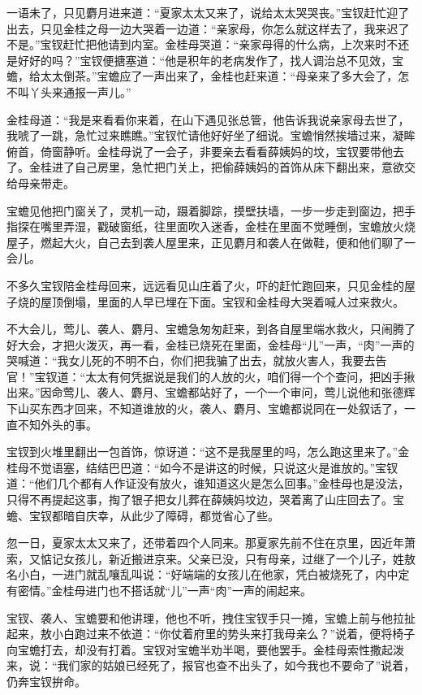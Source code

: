 \documentclass[12pt,oneside]{book}
\begin{document}
一语未了，只见麝月进来道：“夏家太太又来了，说给太太哭哭丧。”宝钗赶忙迎了出去，只见金桂之母一边大哭着一边道：“亲家母，你怎么就这样去了，我来迟了不是。”宝钗赶忙把他请到内室。金桂母哭道：“亲家母得的什么病，上次来时不还是好好的吗？”宝钗便搪塞道：“他是积年的老病发作了，找人调治总不见效，宝蟾，给太太倒茶。”宝蟾应了一声出来了，金桂也赶来道：“母亲来了多大会了，怎不叫丫头来通报一声儿。”

金桂母道：“我是来看看你来着，在山下遇见张总管，他告诉我说亲家母去世了，我唬了一跳，急忙过来瞧瞧。”宝钗忙请他好好坐了细说。宝蟾悄然挨墙过来，凝眸俯首，倚窗静听。金桂母说了一会子，非要亲去看看薛姨妈的坟，宝钗要带他去了。金桂进了自己房里，急忙把门关上，把偷薛姨妈的首饰从床下翻出来，意欲交给母亲带走。

宝蟾见他把门窗关了，灵机一动，蹑着脚踪，摸壁扶墙，一步一步走到窗边，把手指探在嘴里弄湿，戳破窗纸，往里面吹入迷香，金桂在里面不觉睡倒，宝蟾放火烧屋子，燃起大火，自己去到袭人屋里来，正见麝月和袭人在做鞋，便和他们聊了一会儿。

不多久宝钗陪金桂母回来，远远看见山庄着了火，吓的赶忙跑回来，只见金桂的屋子烧的屋顶倒塌，里面的人早已埋在下面。宝钗和金桂母大哭着喊人过来救火。

不大会儿，莺儿、袭人、麝月、宝蟾急匆匆赶来，到各自屋里端水救火，只闹腾了好大会，才把火泼灭，再一看，金桂已烧死在里面，金桂母“儿”一声，“肉”一声的哭喊道：“我女儿死的不明不白，你们把我骗了出去，就放火害人，我要去告官！”宝钗道：“太太有何凭据说是我们的人放的火，咱们得一个个查问，把凶手揪出来。”因命莺儿、袭人、麝月、宝蟾都站好了，一个一个审问，莺儿说他和张德辉下山买东西才回来，不知道谁放的火，袭人、麝月、宝蟾都说同在一处叙话了，一直不知外头的事。

宝钗到火堆里翻出一包首饰，惊讶道：“这不是我屋里的吗，怎么跑这里来了。”金桂母不觉语塞，结结巴巴道：“如今不是讲这的时候，只说这火是谁放的。”宝钗道：“他们几个都有人作证没有放火，谁知道这火是怎么回事。”金桂母也是没法，只得不再提起这事，掏了银子把女儿葬在薛姨妈坟边，哭着离了山庄回去了。宝蟾、宝钗都暗自庆幸，从此少了障碍，都觉省心了些。

忽一日，夏家太太又来了，还带着四个人同来。那夏家先前不住在京里，因近年萧索，又惦记女孩儿，新近搬进京来。父亲已没，只有母亲，过继了一个儿子，姓敖名小白，一进门就乱嚷乱叫说：“好端端的女孩儿在他家，凭白被烧死了，内中定有密情。”金桂母进门也不搭话就“儿”一声“肉”一声的闹起来。

宝钗、袭人、宝蟾要和他讲理，他也不听，拽住宝钗手只一摊，宝蟾上前与他拉扯起来，敖小白跑过来不依道：“你仗着府里的势头来打我母亲么？”说着，便将椅子向宝蟾打去，却没有打着。宝钗对宝蟾半劝半喝，要他罢手。金桂母索性撒起泼来，说：“我们家的姑娘已经死了，报官也查不出头了，如今我也不要命了”说着，仍奔宝钗拚命。
\end{document}
